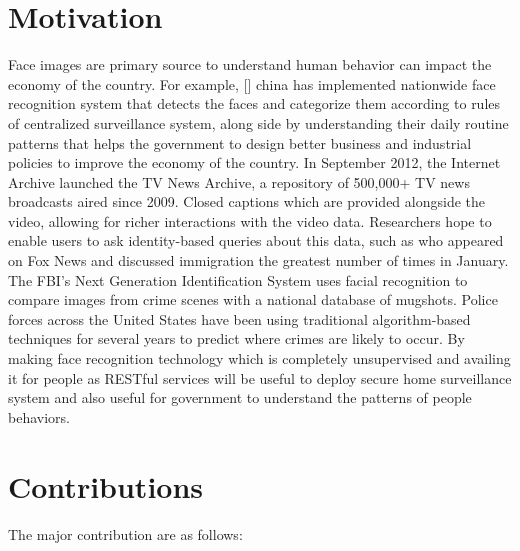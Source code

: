 \documentclass[a4paper,12pt, twoside]{NITKReport}
\begin{document}
	\section{Motivation}
	\label{moti}
	Face images are primary source to understand human behavior can impact the economy of the country. For example, [\cite{3}] china has implemented nationwide face recognition system that detects the faces and categorize them according to rules of centralized surveillance system, along side by understanding their daily routine patterns that helps the government to design better business and industrial policies to improve the economy of the country. 
In September 2012, the Internet Archive launched the TV News Archive, a repository of 500,000+ TV news broadcasts aired since 2009. Closed captions which are provided alongside the video, allowing for richer interactions with the video data. Researchers hope to enable users to ask identity-based queries about this data, such as who appeared on Fox News and discussed immigration the greatest number of times in January. The FBI’s Next Generation Identification System uses facial recognition to compare images from crime scenes with a national database of mugshots. Police forces across the United States have been using traditional algorithm-based techniques for several years to predict where crimes are likely to occur. By making face recognition technology which is completely unsupervised and availing it for people as RESTful services will be useful to deploy secure home surveillance system and also useful for government to understand the patterns of people behaviors.

	
\section{Contributions}
\label{contri}
 The major contribution are as follows:
  
\end{document}
